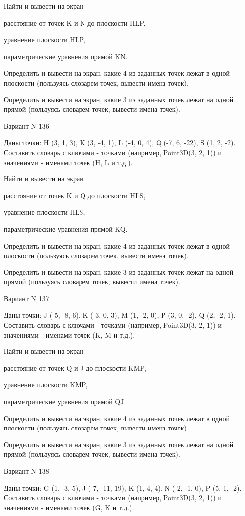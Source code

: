 \documentclass[11pt]{report}
\begin{document}
 
Найти и вывести на экран


расстояние от точек K и N до плоскости HLP,

 
уравнение плоскости HLP,

 
параметрические уравнения прямой KN.


Определить и вывести на экран, какие 4 из заданных точек лежат в одной плоскости (пользуясь словарем точек, вывести имена точек).


Определить и вывести на экран, какие 3 из заданных точек лежат на одной прямой (пользуясь словарем точек, вывести имена точек).

Вариант N 136

Даны точки: H (3, 1, 3), K (3, -4, 1), L (-4, 0, 4), Q (-7, 6, -22), S (1, 2, -2).
Составить словарь с ключами - точками (например, Point3D(3, 2, 1)) и значениями - именами точек (H, L и т.д.).

 
Найти и вывести на экран


расстояние от точек K и Q до плоскости HLS,

 
уравнение плоскости HLS,

 
параметрические уравнения прямой KQ.


Определить и вывести на экран, какие 4 из заданных точек лежат в одной плоскости (пользуясь словарем точек, вывести имена точек).


Определить и вывести на экран, какие 3 из заданных точек лежат на одной прямой (пользуясь словарем точек, вывести имена точек).

Вариант N 137

Даны точки: J (-5, -8, 6), K (-3, 0, 3), M (1, -2, 0), P (3, 0, -2), Q (2, -2, 1).
Составить словарь с ключами - точками (например, Point3D(3, 2, 1)) и значениями - именами точек (K, M и т.д.).

 
Найти и вывести на экран


расстояние от точек Q и J до плоскости KMP,

 
уравнение плоскости KMP,

 
параметрические уравнения прямой QJ.


Определить и вывести на экран, какие 4 из заданных точек лежат в одной плоскости (пользуясь словарем точек, вывести имена точек).


Определить и вывести на экран, какие 3 из заданных точек лежат на одной прямой (пользуясь словарем точек, вывести имена точек).

Вариант N 138

Даны точки: G (1, -3, 5), J (-7, -11, 19), K (1, 4, 4), N (-2, -1, 0), P (5, 1, -2).
Составить словарь с ключами - точками (например, Point3D(3, 2, 1)) и значениями - именами точек (G, K и т.д.).
\end{document}
